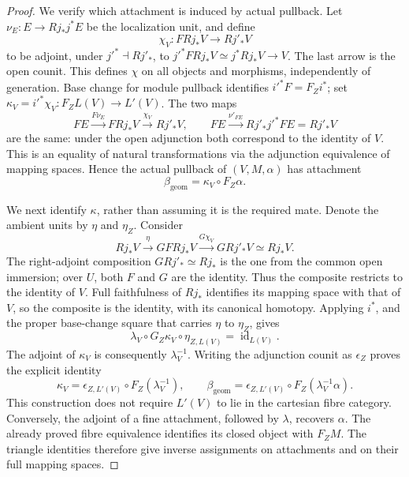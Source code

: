 \documentclass[11pt]{article}
\theoremstyle{definition}
\theoremstyle{remark}
\begin{document}
\begin{proof}
We verify which attachment is induced by actual pullback.
Let $\nu_E:E\to Rj_*j^*E$ be the localization unit, and define
\[
 \chi_V:F Rj_*V\longrightarrow Rj'_*V
\]
to be adjoint, under $j'^*\dashv Rj'_*$, to
$j'^*F Rj_*V\simeq j^*Rj_*V\to V$.
The last arrow is the open counit.  This defines $\chi$ on all
objects and morphisms, independently of generation.  Base change
for module pullback identifies $i'^*F=F_Zi^*$; set
$\kappa_V=i'^*\chi_V:F_ZL(V)\to L'(V)$.
The two maps
\[
 F E\xrightarrow{F\nu_E}F Rj_*V\xrightarrow{\chi_V}Rj'_*V,
 \qquad
 F E\xrightarrow{\nu'_{FE}}Rj'_*j'^*FE=Rj'_*V
\]
are the same: under the open adjunction both correspond to the
identity of $V$.  This is an equality of natural transformations
via the adjunction equivalence of mapping spaces.  Hence the
actual pullback of $(V,M,\alpha)$ has attachment
\[
 \beta_{\mathrm{geom}}=\kappa_V\circ F_Z\alpha.
\]

We next identify $\kappa$, rather than assuming it is the required
mate.  Denote the ambient units by $\eta$ and $\eta_Z$.  Consider
\[
 Rj_*V\xrightarrow{\eta}GF Rj_*V
          \xrightarrow{G\chi_V}G Rj'_*V\simeq Rj_*V.
\]
The right-adjoint composition $G Rj'_*\simeq Rj_*$ is the one
from the common open immersion; over $U$, both $F$ and $G$ are
the identity.  Thus the composite restricts to the identity of $V$.
Full faithfulness of $Rj_*$ identifies its mapping space with that
of $V$, so the composite is the identity, with its canonical homotopy.
Applying $i^*$, and the proper base-change square that carries
$\eta$ to $\eta_Z$, gives
\[
 \lambda_V\circ G_Z\kappa_V\circ\eta_{Z,L(V)}
                         =\operatorname{id}_{L(V)}.
\]
The adjoint of $\kappa_V$ is consequently $\lambda_V^{-1}$.
Writing the adjunction counit as $\epsilon_Z$ proves the explicit
identity
\begin{equation}
 \kappa_V=\epsilon_{Z,L'(V)}\circ F_Z(\lambda_V^{-1}),\qquad
 \beta_{\mathrm{geom}}
 =\epsilon_{Z,L'(V)}\circ F_Z(\lambda_V^{-1}\alpha).
 \label{eq:actual-pullback-attachment}
\end{equation}
This construction does not require $L'(V)$ to lie in the cartesian
fibre category.  Conversely, the adjoint of a fine attachment,
followed by $\lambda$, recovers $\alpha$.  The already proved fibre
equivalence identifies its closed object with $F_ZM$.  The triangle
identities therefore give inverse assignments on attachments and
on their full mapping spaces.


\end{proof}
\end{document}
